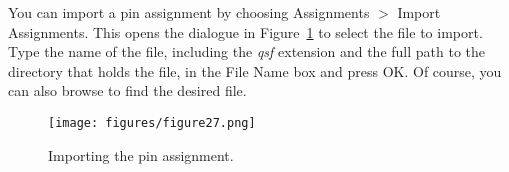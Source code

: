 You can import a pin assignment by choosing {\sf Assignments $>$ Import Assignments}. 
This opens the dialogue in Figure~\ref{fig:27} to select the file to import. 
Type the name of the file, including the {\it qsf} extension and the full path
to the directory that holds the file, in the File Name box and press {\sf OK}.
Of course, you can also browse to find the desired file.
 
\begin{figure}[H]
   \begin{center}
      \texttt{[image: figures/figure27.png]}
   \caption{Importing the pin assignment.} 
	 \label{fig:27}
	 \end{center}
\end{figure}
